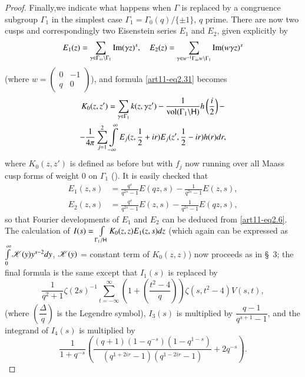 \begin{proof}
Finally,\pageoriginale we indicate what happens when $\Gamma$ is replaced by a congruence subgroup $\Gamma_1$ in the simplest case $\Gamma_1 = \Gamma_0 (q) / \{ \pm 1\}$, $q$ prime. There are now two cusps and correspondingly two Eisenstein series $E_1$ and $E_2$, given explicitly by 
$$
E_1 (z) = \sum\limits_{\gamma \in \Gamma_\infty \backslash \Gamma_1} \operatorname{Im} (\gamma z)^s, \quad E_2 (z) = \sum\limits_{\gamma \in w^{-1} \Gamma_\infty w \backslash \Gamma_1} \operatorname{Im} (w \gamma z)^s
$$
(where $w = \left(\begin{matrix}
0 & -1\\q & 0
\end{matrix}
\right)$), and formula \eqref{art11-eq2.31} becomes 
\begin{gather*}
K_0 (z,z') =\sum\limits_{\gamma \in \Gamma_1} k(z, \gamma z') -\frac{1}{\operatorname{vol} (\Gamma_1 \backslash \mathsf{H})} h \left(\frac{i}{2} \right)-\\
- \frac{1}{4\pi} \sum\limits^2_{j=1} \int\limits^\infty_{-\infty} E_j (z, \frac{1}{2} + ir) E_j (z' , \frac{1}{2} - ir) h(r) dr, 
\end{gather*}
where $K_0 (z,z')$ is defined as before but with $f_j$ now running over all Maass cusp forms of weight 0 on $\Gamma_1$ (\cf \cite{art11-4}). It is easily checked that 
\begin{align*}
E_1 (z,s) & = \frac{q^s}{q^{2s}-1} E (qz, s) - \frac{1}{q^{2s} -1} E (z,s),\\
E_2 (z,s) & = \frac{q^s}{q^{2s} -1} E(z,s) - \frac{1}{q^{2s} -1} E(qz,s),
\end{align*}
 so that Fourier developments of $E_1$ and $E_2$ can be deduced from \eqref{art11-eq2.6}. The calculation of $I(s) = \int\limits_{\Gamma_1 / \mathsf{H}} K_0 (z,z) E_1 (z,s) dz$ (which again can be expressed as $\int\limits^\infty_0 \mathscr{K} (y) y^{s-2} dy$, $\mathscr{K} (y)$ = constant term of $K_0 (z,z)$) now proceeds as in \S~3; the final formula is the same except that $I_1 (s)$ is replaced by
$$
\frac{1}{q^2 +1} \zeta(2s)^{-1} \sum\limits^\infty_{t = - \infty} \left(1+ \left(\frac{t^2 - 4}{q} \right) \right) \zeta(s, t^2 - 4) V (s,t),
$$ 
(where $\left(\dfrac{\Delta}{q} \right)$ is the Legendre symbol), $I_3 (s)$ is multiplied by $\dfrac{q-1}{q^{s+1} -1}$, and the integrand of $I_4 (s)$ is multiplied by 
$$
\frac{1}{1+q^{-s}} \left(\frac{(q+1) (1-q^{-s}) (1-q^{1-s})}{(q^{1+2 ir} - 1) (q^{1-2 ir} -1)} + 2 q^{-s}\right).
$$
\end{proof}

